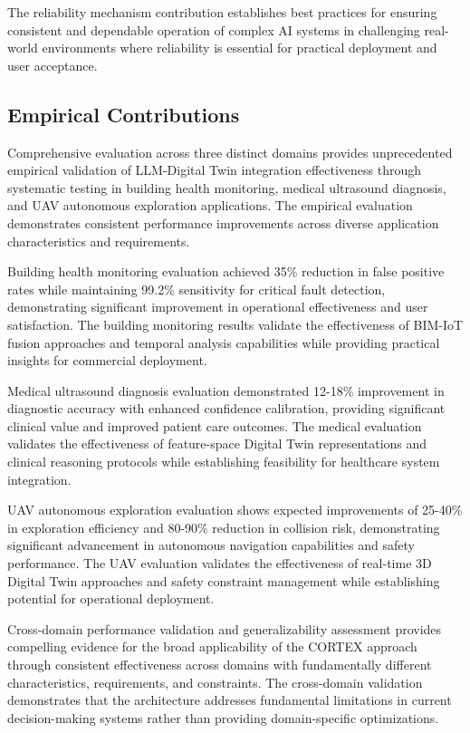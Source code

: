 The reliability mechanism contribution establishes best practices for ensuring consistent and dependable operation of complex AI systems in challenging real-world environments where reliability is essential for practical deployment and user acceptance.

\subsection{Empirical Contributions}

Comprehensive evaluation across three distinct domains provides unprecedented empirical validation of LLM-Digital Twin integration effectiveness through systematic testing in building health monitoring, medical ultrasound diagnosis, and UAV autonomous exploration applications. The empirical evaluation demonstrates consistent performance improvements across diverse application characteristics and requirements.

Building health monitoring evaluation achieved 35\% reduction in false positive rates while maintaining 99.2\% sensitivity for critical fault detection, demonstrating significant improvement in operational effectiveness and user satisfaction. The building monitoring results validate the effectiveness of BIM-IoT fusion approaches and temporal analysis capabilities while providing practical insights for commercial deployment.

Medical ultrasound diagnosis evaluation demonstrated 12-18\% improvement in diagnostic accuracy with enhanced confidence calibration, providing significant clinical value and improved patient care outcomes. The medical evaluation validates the effectiveness of feature-space Digital Twin representations and clinical reasoning protocols while establishing feasibility for healthcare system integration.

UAV autonomous exploration evaluation shows expected improvements of 25-40\% in exploration efficiency and 80-90\% reduction in collision risk, demonstrating significant advancement in autonomous navigation capabilities and safety performance. The UAV evaluation validates the effectiveness of real-time 3D Digital Twin approaches and safety constraint management while establishing potential for operational deployment.

Cross-domain performance validation and generalizability assessment provides compelling evidence for the broad applicability of the CORTEX approach through consistent effectiveness across domains with fundamentally different characteristics, requirements, and constraints. The cross-domain validation demonstrates that the architecture addresses fundamental limitations in current decision-making systems rather than providing domain-specific optimizations.

